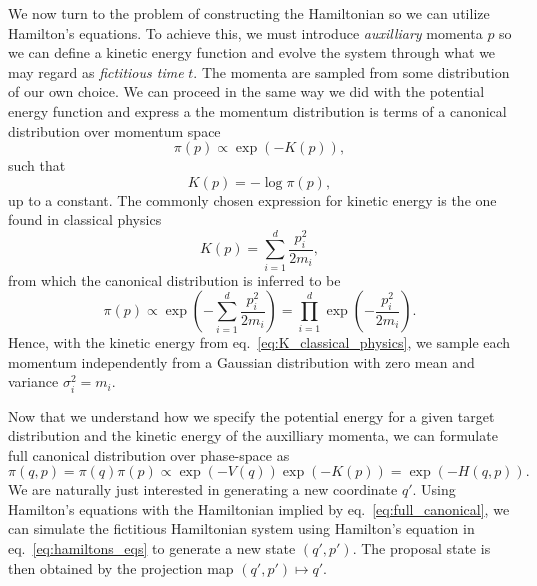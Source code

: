 We now turn to the problem of constructing the Hamiltonian so we can utilize Hamilton's equations.
To achieve this, we must introduce \textit{auxilliary} momenta $p$ so we can define a kinetic energy function
and evolve the system through what we may regard as \textit{fictitious time} $t$. 
The momenta are sampled from some distribution of our own choice. We can proceed in the same way we did
with the potential energy function and express a the momentum distribution is terms of a canonical distribution
over momentum space
\begin{equation}
  \pi(p) \propto \exp\left(-K(p)\right),
\end{equation}
such that
\begin{equation}
  K(p) = -\log \pi (p),
\end{equation}
up to a constant. The commonly chosen expression for kinetic energy is 
the one found in classical physics
\begin{equation}\label{eq:K_classical_physics}
  K(p) = \sum_{i=1}^d \frac{p_i^2}{2m_i},
\end{equation}
from which the canonical distribution is inferred to be
\begin{equation}\label{eq:canonical_p}
  \pi(p) \propto \exp\left(-\sum_{i=1}^d \frac{p_i^2}{2m_i}\right) = \prod_{i=1}^d \exp\left(-\frac{p_i^2}{2m_i}\right).
\end{equation}
Hence, with the kinetic energy from eq.~\eqref{eq:K_classical_physics}, we 
sample each momentum independently from a Gaussian distribution with zero mean and variance $\sigma_i^2 = m_i$.

Now that we understand how we specify the potential energy for a given target distribution and
the kinetic energy of the auxilliary momenta, we can formulate full canonical distribution over phase-space as
\begin{equation}\label{eq:full_canonical}
  \pi(q, p) = \pi(q)\pi(p) \propto \exp\left(-V(q)\right)\exp\left(-K(p)\right) = \exp\left(-H(q, p)\right).
\end{equation}
We are naturally just interested in generating a new coordinate $q'$. Using Hamilton's equations
with the Hamiltonian implied by eq.~\eqref{eq:full_canonical}, we can simulate the fictitious Hamiltonian
system using Hamilton's equation in eq.~\eqref{eq:hamiltons_eqs} to generate a new state $(q', p')$. The proposal state
is then obtained by the projection map $(q', p') \mapsto q'$.

